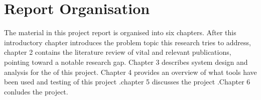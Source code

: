 \newpage
\section{Report Organisation}
The material in this project report is organised into six chapters. After this introductory chapter introduces the problem topic this research tries to address, chapter 2 contains the literature review of vital and relevant publications, pointing toward a notable research gap. Chapter 3 describes system design and analysis for the of this project. Chapter 4 provides an overview of what tools have been used and testing of this project .chapter 5 discusses the project .Chapter 6 conludes the project.